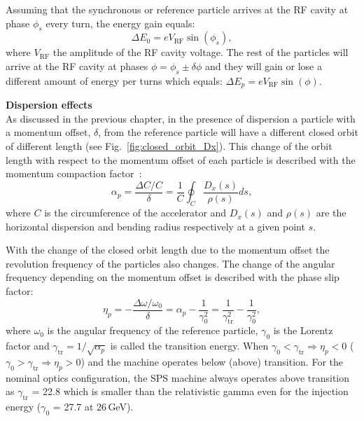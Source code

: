 Assuming that the synchronous or reference particle arrives at the RF cavity at phase $\phi_s$ every turn, the energy gain equals:
\begin{equation}\label{eq:enerhy_gain_synchronous}
    \Delta E_0 = e V_\mathrm{RF} \sin{(\phi_s)}, 
\end{equation}
where $V_\mathrm{RF}$ the amplitude of the RF cavity voltage. The rest of the particles will arrive at the RF cavity at phases $\phi = \phi_s \pm \delta \phi$ and they will gain or lose a different amount of energy per turns which equals: $\Delta E_p = e V_\mathrm{RF} \sin{(\phi)}$. 
 
\textbf{Dispersion effects}\\
As discussed in the previous chapter, in the presence of dispersion a particle with a momentum offset, $\delta$, from the reference particle will have a different closed orbit of different length (see Fig.~\ref{fig:closed_orbit_Dx}). This change of the orbit length with respect to the momentum offset of each particle is described with the momentum compaction factor~\cite{emetral_juas_2018}: %
\begin{equation}\label{eq:compaction_factor}
    \alpha_p = \frac{\Delta C /C}{\delta} = \frac{1}{C} \oint _C \frac{D_x(s)}{\rho(s)} ds,
\end{equation} %
where $C$ is the circumference of the accelerator and $D_x(s)$ and $\rho(s)$ are the horizontal dispersion and bending radius respectively at a given point $s$.

With the change of the closed orbit length due to the momentum offset the revolution frequency of the particles also changes. The change of the angular frequency depending on the momentum offset is described with the phase slip factor:
\begin{equation}\label{eq:phase_slip_factor}
    \eta_p = -\frac{\Delta \omega / \omega_0}{\delta} = \alpha_p - \frac{1}{\gamma^2_0} = \frac{1}{\gamma^2_\mathrm{tr}} - \frac{1}{\gamma^2_0},
\end{equation}
where $\omega_0$ is the angular frequency of the reference particle, $\gamma_0$ is the Lorentz factor and $\gamma_\mathrm{tr} = 1/\sqrt{\alpha_p}$ is called the transition energy. When $\gamma_0 < \gamma_\mathrm{tr} \Rightarrow \eta_p <0$ ($\gamma_0 > \gamma_\mathrm{tr} \Rightarrow \eta_p > 0$) and the machine operates below (above) transition. For the nominal optics configuration, the SPS machine always operates above transition as $\gamma_\mathrm{tr}$ = 22.8 which is smaller than the relativistic gamma even for the injection energy ($\gamma_0$ = 27.7 at 26\,GeV).


